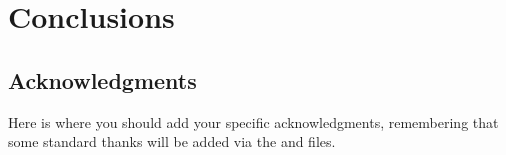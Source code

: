 \documentclass[\docopts]{\docclass}
\begin{document}

\section{Conclusions}
\label{sec:conclusions}



\subsection*{Acknowledgments}

Here is where you should add your specific acknowledgments, remembering that some standard thanks will be added via the  and  files.







\end{document}
